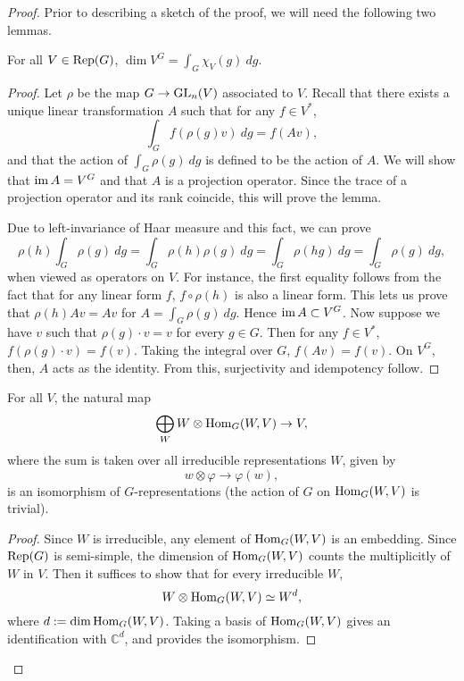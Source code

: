 \begin{proof}
Prior to describing a sketch of the proof, we will need the following two
lemmas.

\begin{lem}\label{dims}
For all $V \in \mathrm{Rep}(G)$, $\dim V^G = \displaystyle\int_G \chi_V(g) \ dg$.
\end{lem}

\begin{proof}
Let $\rho$ be the map $G \rightarrow \operatorname{GL}_n(V)$ associated to $V$. Recall
that there exists a unique linear transformation $A$ such that for any
$f \in V^*$, \[ \int_G f(\rho(g) v) \ dg = f(Av), \] and that the action of
$\int_G \rho(g) \ dg$ is defined to be the action of $A$. We will show that
$\operatorname{im} A = V^G$ and that $A$ is a projection operator. Since the trace of
a projection operator and its rank coincide, this will prove the lemma.

Due to left-invariance of Haar measure and this fact, we can prove
\[\rho(h) \int_G \rho(g) \ dg = \int_G \rho(h) \rho(g) \ dg
    = \int_G \rho(hg) \ dg = \int_G \rho(g) \ dg,\]
when viewed as operators on $V$. For instance, the first equality follows from
the fact that for any linear form $f$, $f \circ \rho(h)$ is also a linear form.
This lets us prove that $\rho(h) Av = Av$ for $A = \int_G \rho(g) \ dg$. Hence
$\operatorname{im} A \subset V^G$. Now suppose we have $v$ such that $\rho(g) \cdot v = v$
for every $g \in G$. Then for any $f \in V^*$, $f(\rho(g) \cdot v) = f(v)$.
Taking the integral over $G$, $f(Av) = f(v)$. On $V^G$, then, $A$ acts as
the identity. From this, surjectivity and idempotency follow.
\end{proof}

\begin{lem}\label{b}
For all $V$, the natural map
\[ \bigoplus_{W} W \otimes \operatorname{Hom}_G(W, V) \rightarrow V, \]
where the sum is taken over all irreducible representations $W$, given by
\[ w \otimes \varphi \rightarrow \varphi(w), \]
is an isomorphism of $G$-representations (the action of $G$ on
$\operatorname{Hom}_G(W, V)$ is trivial).
\end{lem}

\begin{proof}
Since $W$ is irreducible, any element of $\operatorname{Hom}_G(W, V)$ is an embedding.
Since $\mathrm{Rep}(G)$ is semi-simple, the dimension of $\operatorname{Hom}_G(W, V)$ counts
the multiplicitly of $W$ in $V$. Then it suffices to show that for every
irreducible $W$,
\[ W \otimes \operatorname{Hom}_G(W, V) \simeq W^d, \]
where $d := \dim \operatorname{Hom}_G(W, V)$. Taking a basis of
$\operatorname{Hom}_G(W, V)$ gives an identification with $\mathbb{C}^d$, and provides the
isomorphism.
\end{proof}


\end{proof}
